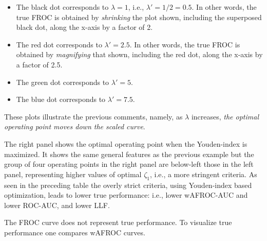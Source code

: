 \documentclass[
]{book}
\providecommand{\tightlist}{%
  \setlength{\itemsep}{0pt}\setlength{\parskip}{0pt}}
\begin{document}
\begin{itemize}
\tightlist
\item
  The black dot corresponds to \(\lambda = 1\), i.e., \(\lambda' = 1/2 = 0.5\). In other words, the true FROC is obtained by \emph{shrinking} the plot shown, including the superposed black dot, along the x-axis by a factor of 2.\\
\item
  The red dot corresponds to \(\lambda' = 2.5\). In other words, the true FROC is obtained by \emph{magnifying} that shown, including the red dot, along the x-axis by a factor of 2.5.\\
\item
  The green dot corresponds to \(\lambda' = 5\).
\item
  The blue dot corresponds to \(\lambda' = 7.5\).
\end{itemize}

These plots illustrate the previous comments, namely, as \(\lambda\) increases, \emph{the optimal operating point moves down the scaled curve}.

The right panel shows the optimal operating point when the Youden-index is maximized. It shows the same general features as the previous example but the group of four operating points in the right panel are below-left those in the left panel, representing higher values of optimal \(\zeta_1\), i.e., a more stringent criteria. As seen in the preceding table the overly strict criteria, using Youden-index based optimization, leads to lower true performance: i.e., lower wAFROC-AUC and lower ROC-AUC, and lower LLF.

The FROC curve does not represent true performance. To visualize true performance one compares wAFROC curves.
\end{document}
